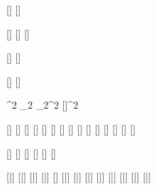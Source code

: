 

\varDef{\angleTwo}{\beta}
\varDef{\angleOne}{\alpha}
\varDef{\angleFour}{\Pi}
\varDef{\angleThree}{\Gamma}

[\mathbb]
[\mathbb]

[\mathcal]
[\mathcal]
[\mathbb]

[\mathcal]
[\mathcal]

[\vectorFmt]
[\unitVecFmt]

^{2}
_{2}
_{2}^{2}
[\vectorFmt]^{2}

\varDef{\rbardot}{\rbar}[\dot]
\varDef{\rbarddot}{\rbar}[\ddot]
[\dot]
\varDef{\rhobardot}{\rhobar}[\dot]
\varDef{\rhodot}{\rho}[\dot]
\varDef{\thetadot}{\theta}[\dot]
[\ddot]
[\ddot]
[\dot]
[\ddot]
[\ddot]
[\dot]
[\ddot]
[\ddot]
[\dot]

[\hat]
[\hat]
[\hat]
[\hat]
[\hat]
[\hat]

[\bar]
[\bar]
[\bar]
[\bar]
[\tilde]
[\bar]
[\bar]
[\bar]
[\bar]
[\bar]
[\bar]
\varDef{\rhobar}{\rho}[\bar]
\varDef{\omegabar}{\omega}[\bar]
